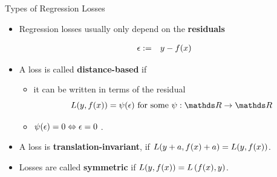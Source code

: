 \begin{vbframe}{Types of Regression Losses}

\begin{itemize}
  \item Regression losses usually only depend on the \textbf{ residuals}

  \vspace*{-0.5cm}

  \begin{eqnarray*}
    \eps &:=& y - \fx %
  \end{eqnarray*}

  \item A loss is called \textbf{distance-based} if
  \begin{itemize}
    \item it can be written in terms of the residual
    $$
      \Lxy = \psi (\eps) \text{ for some } \psi: \R \to \R
    $$
    \item $\psi(\epsilon) = 0 \Leftrightarrow \epsilon = 0$ .
  \end{itemize}
  \item A loss is \textbf{translation-invariant}, if $L(y + a, f(x) + a) = L(y, f(x))$.
  \item Losses are called \textbf{symmetric} if $L(y, f(x)) = L\left(f(x), y\right)$. 
\end{itemize}

\end{vbframe}



